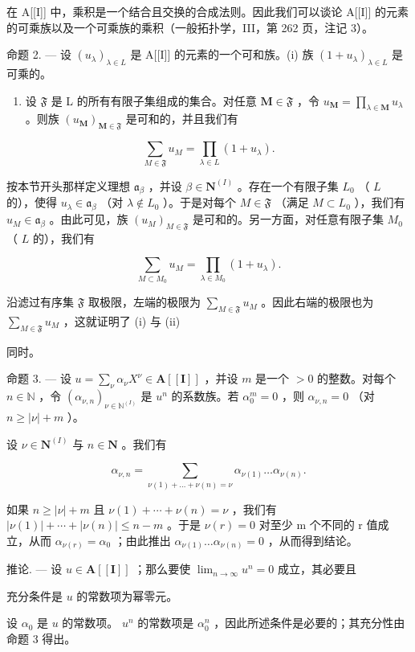 在 A{[}{[}I{]}{]} 中，乘积是一个结合且交换的合成法则。因此我们可以谈论 A{[}{[}I{]}{]} 的元素的可乘族以及一个可乘族的乘积（一般拓扑学，III，第 262 页，注记 3）。

命题 2. --- 设 \((u_{\lambda})_{\lambda \in L}\) 是 A{[}{[}I{]}{]} 的元素的一个可和族。(i) 族 \((1 + u_{\lambda})_{\lambda \in L}\) 是可乘的。

\begin{enumerate}
\def\labelenumi{(\roman{enumi})}
\setcounter{enumi}{1}
\tightlist
\item
  设 \(\mathfrak{F}\) 是 L 的所有有限子集组成的集合。对任意 \(\mathbf{M} \in \mathfrak{F}\) ，令 \(u_{\mathbf{M}} = \prod_{\lambda \in \mathbf{M}} u_{\lambda}\) 。则族 \((u_{\mathbf{M}})_{\mathbf{M} \in \mathfrak{F}}\) 是可和的，并且我们有
\end{enumerate}

\[
\sum_ {M \in \mathfrak {F}} u _ {M} = \prod_ {\lambda \in L} (1 + u _ {\lambda}).
\]

按本节开头那样定义理想 \(\mathfrak{a}_{\beta}\) ，并设 \(\beta \in \mathbf{N}^{(I)}\) 。存在一个有限子集 \(L_0\) （ \(L\) 的），使得 \(u_{\lambda} \in \mathfrak{a}_{\beta}\) （对 \(\lambda \notin L_0\) ）。于是对每个 \(M \in \mathfrak{F}\) （满足 \(M \subset L_0\) ），我们有 \(u_M \in \mathfrak{a}_{\beta}\) 。由此可见，族 \((u_M)_{M \in \mathfrak{F}}\) 是可和的。另一方面，对任意有限子集 \(M_0\) （ \(L\) 的），我们有

\[
\sum_ {M \subset M _ {0}} u _ {M} = \prod_ {\lambda \in M _ {0}} (1 + u _ {\lambda}).
\]

沿滤过有序集 \(\mathfrak{F}\) 取极限，左端的极限为 \(\sum_{M\in\mathfrak{F}}u_{M}\) 。因此右端的极限也为 \(\sum_{M\in\mathfrak{F}}u_{M}\) ，这就证明了 (i) 与 (ii)

同时。

命题 3. --- 设 \(u = \sum_{\nu} \alpha_{\nu} X^{\nu} \in \mathbf{A}[[\mathbf{I}]]\) ，并设 \(m\) 是一个 \(> 0\) 的整数。对每个 \(n \in \mathbb{N}\) ，令 \((\alpha_{\nu, n})_{\nu \in \mathbb{N}^{(I)}}\) 是 \(u^n\) 的系数族。若 \(\alpha_0^m = 0\) ，则 \(\alpha_{\nu, n} = 0\) （对 \(n \geqslant |\nu| + m\) ）。

设 \(\nu \in \mathbf{N}^{(I)}\) 与 \(n\in \mathbf{N}\) 。我们有

\[
\alpha_ {\nu , n} = \sum_ {\nu (1) + \dots + \nu (n) = \nu} \alpha_ {\nu (1)} \dots \alpha_ {\nu (n)}.
\]

如果 \(n \geqslant |\nu| + m\) 且 \(\nu(1) + \cdots + \nu(n) = \nu\) ，我们有 \(|\nu(1)| + \cdots + |\nu(n)| \leqslant n - m\) 。于是 \(\nu(r) = 0\) 对至少 m 个不同的 r 值成立，从而 \(\alpha_{\nu(r)} = \alpha_0\) ；由此推出 \(\alpha_{\nu(1)} \ldots \alpha_{\nu(n)} = 0\) ，从而得到结论。

推论. --- 设 \(u \in \mathbf{A}[[\mathbf{I}]]\) ；那么要使 \(\lim_{n \to \infty} u^n = 0\) 成立，其必要且

充分条件是 \(u\) 的常数项为幂零元。

设 \(\alpha_0\) 是 \(u\) 的常数项。 \(u^n\) 的常数项是 \(\alpha_0^n\) ，因此所述条件是必要的；其充分性由命题 3 得出。
\relax{}
